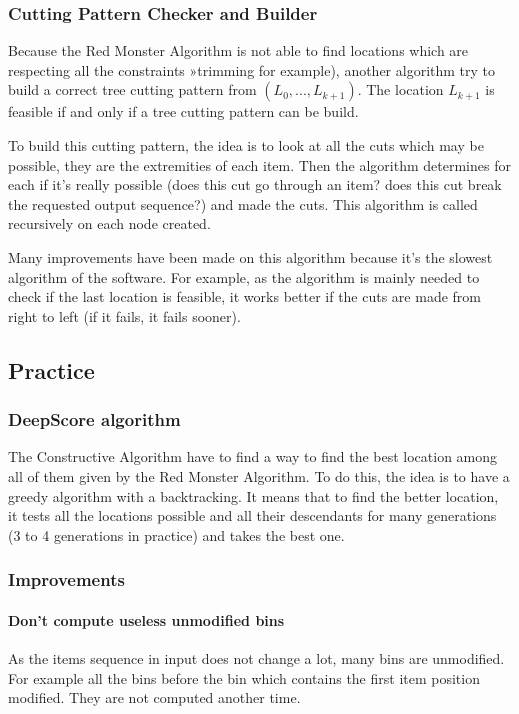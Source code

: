 \documentclass{article}
\begin{document}
        \subsubsection{Cutting Pattern Checker and Builder}
Because the Red Monster Algorithm is not able to find locations which are respecting all the constraints »trimming for example), another algorithm try to build a correct tree cutting pattern from $(L_0, ..., L_{k + 1})$. The location $L_{k + 1}$ is feasible if and only if a tree cutting pattern can be build.

To build this cutting pattern, the idea is to look at all the cuts which may be possible, they are the extremities of each item. Then the algorithm determines for each if it's really possible (does this cut go through an item? does this cut break the requested output sequence?) and made the cuts. This algorithm is called recursively on each node created.

Many improvements have been made on this algorithm because it's the slowest algorithm of the software. For example, as the algorithm is mainly needed to check if the last location is feasible, it works better if the cuts are made from right to left (if it fails, it fails sooner).

    \subsection{Practice}
        \subsubsection{DeepScore algorithm}
The Constructive Algorithm have to find a way to find the best location among all of them given by the Red Monster Algorithm. To do this, the idea is to have a greedy algorithm with a backtracking. It means that to find the better location, it tests all the locations possible and all their descendants for many generations (3 to 4 generations in practice) and takes the best one.

\subsubsection{Improvements}
    \paragraph{Don't compute useless unmodified bins}
As the items sequence in input does not change a lot, many bins are unmodified. For example all the bins before the bin which contains the first item position modified. They are not computed another time.
\end{document}
